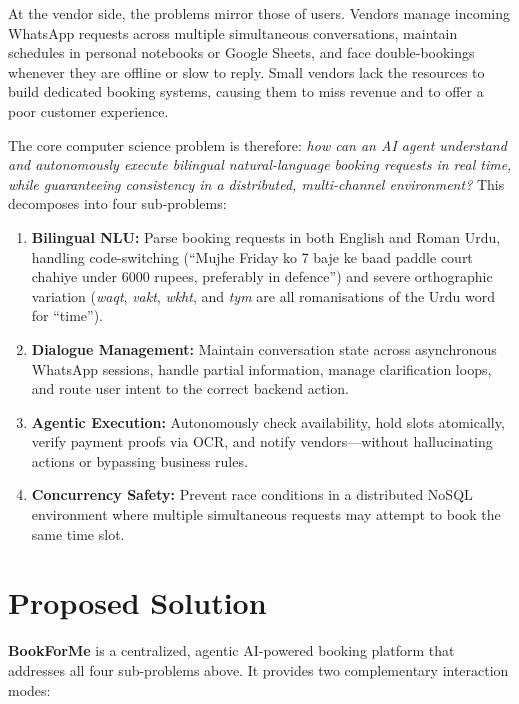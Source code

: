 At the vendor side, the problems mirror those of users.  Vendors manage incoming
WhatsApp requests across multiple simultaneous conversations, maintain schedules in
personal notebooks or Google Sheets, and face double-bookings whenever they are
offline or slow to reply.  Small vendors lack the resources to build dedicated booking
systems, causing them to miss revenue and to offer a poor customer experience.

The core computer science problem is therefore: \textit{how can an AI agent
understand and autonomously execute bilingual natural-language booking requests in
real time, while guaranteeing consistency in a distributed, multi-channel
environment?}  This decomposes into four sub-problems:

\begin{enumerate}
  \item \textbf{Bilingual NLU:} Parse booking requests in both English and Roman
        Urdu, handling code-switching (``Mujhe Friday ko 7 baje ke baad paddle court
        chahiye under 6000 rupees, preferably in defence'') and severe orthographic
        variation (\textit{waqt}, \textit{vakt}, \textit{wkht}, and \textit{tym} are
        all romanisations of the Urdu word for ``time'').
  \item \textbf{Dialogue Management:} Maintain conversation state across asynchronous
        WhatsApp sessions, handle partial information, manage clarification loops, and
        route user intent to the correct backend action.
  \item \textbf{Agentic Execution:} Autonomously check availability, hold slots
        atomically, verify payment proofs via OCR, and notify vendors---without
        hallucinating actions or bypassing business rules.
  \item \textbf{Concurrency Safety:} Prevent race conditions in a distributed NoSQL
        environment where multiple simultaneous requests may attempt to book the same
        time slot.
\end{enumerate}

\section{Proposed Solution}
\label{sec:intro-solution}

\textbf{BookForMe} is a centralized, agentic AI-powered booking platform that
addresses all four sub-problems above.  It provides two complementary interaction
modes:

